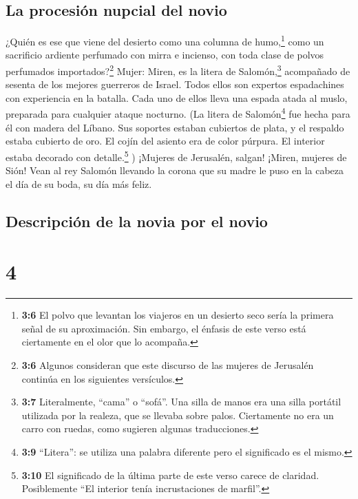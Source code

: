 \hypertarget{la-procesiuxf3n-nupcial-del-novio}{%
\subsection{La procesión nupcial del
novio}\label{la-procesiuxf3n-nupcial-del-novio}}

 ¿Quién es ese que viene del desierto como una columna de
humo,\footnote{\textbf{3:6} El polvo que levantan los viajeros en un
  desierto seco sería la primera señal de su aproximación. Sin embargo,
  el énfasis de este verso está ciertamente en el olor que lo acompaña.}
como un sacrificio ardiente perfumado con mirra e incienso, con toda
clase de polvos perfumados importados?\footnote{\textbf{3:6} Algunos
  consideran que este discurso de las mujeres de Jerusalén continúa en
  los siguientes versículos.} Mujer:  Miren, es la litera
de Salomón,\footnote{\textbf{3:7} Literalmente, ``cama'' o ``sofá''. Una
  silla de manos era una silla portátil utilizada por la realeza, que se
  llevaba sobre palos. Ciertamente no era un carro con ruedas, como
  sugieren algunas traducciones.} acompañado de sesenta de los mejores
guerreros de Israel.  Todos ellos son expertos
espadachines con experiencia en la batalla. Cada uno de ellos lleva una
espada atada al muslo, preparada para cualquier ataque nocturno.
 (La litera de Salomón\footnote{\textbf{3:9} ``Litera'':
  se utiliza una palabra diferente pero el significado es el mismo.} fue
hecha para él con madera del Líbano.  Sus soportes
estaban cubiertos de plata, y el respaldo estaba cubierto de oro. El
cojín del asiento era de color púrpura. El interior estaba decorado con
detalle.\footnote{\textbf{3:10} El significado de la última parte de
  este verso carece de claridad. Posiblemente ``El interior tenía
  incrustaciones de marfil''.} ) ¡Mujeres de Jerusalén, 
salgan! ¡Miren, mujeres de Sión! Vean al rey Salomón llevando la corona
que su madre le puso en la cabeza el día de su boda, su día más feliz.

\hypertarget{descripciuxf3n-de-la-novia-por-el-novio}{%
\subsection{Descripción de la novia por el
novio}\label{descripciuxf3n-de-la-novia-por-el-novio}}

\hypertarget{section-3}{%
\section{4}\label{section-3}}

